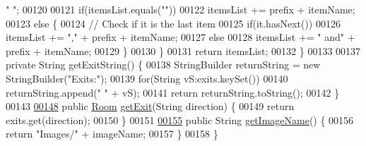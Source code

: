 \begin{DoxyCode}
       \textcolor{stringliteral}{" "};
00120 
00121             \textcolor{keywordflow}{if}(itemsList.equals(\textcolor{stringliteral}{""}))
00122                 itemsList += prefix + itemName;
00123             \textcolor{keywordflow}{else} \{
00124                 \textcolor{comment}{// Check if it is the last item}
00125                 \textcolor{keywordflow}{if}(it.hasNext())
00126                     itemsList += \textcolor{stringliteral}{","} + prefix + itemName;
00127                 \textcolor{keywordflow}{else}
00128                     itemsList += \textcolor{stringliteral}{" and"} + prefix + itemName;
00129             \}
00130         \}
00131         \textcolor{keywordflow}{return} itemsList;
00132     \}
00133 
00137     \textcolor{keyword}{private} String getExitString() \{
00138         StringBuilder returnString = \textcolor{keyword}{new} StringBuilder(\textcolor{stringliteral}{"Exits:"});
00139         \textcolor{keywordflow}{for}(String vS:exits.keySet())
00140             returnString.append(\textcolor{stringliteral}{" "} + vS);
00141         \textcolor{keywordflow}{return} returnString.toString();
00142     \}
00143 
\hypertarget{Room_8java_source_l00148}{}\hyperlink{classRoom_a384ab8c844e5775f87de24d6c470637e}{00148}     \textcolor{keyword}{public} \hyperlink{classRoom}{Room} \hyperlink{classRoom_a384ab8c844e5775f87de24d6c470637e}{getExit}(String direction) \{
00149         \textcolor{keywordflow}{return} exits.get(direction);
00150     \}
00151 
\hypertarget{Room_8java_source_l00155}{}\hyperlink{classRoom_a8177668df4d8be718812934673c42649}{00155}     \textcolor{keyword}{public} String \hyperlink{classRoom_a8177668df4d8be718812934673c42649}{getImageName}() \{
00156         \textcolor{keywordflow}{return} \textcolor{stringliteral}{"Images/"}  + imageName;
00157     \}
00158 \}
\end{DoxyCode}
